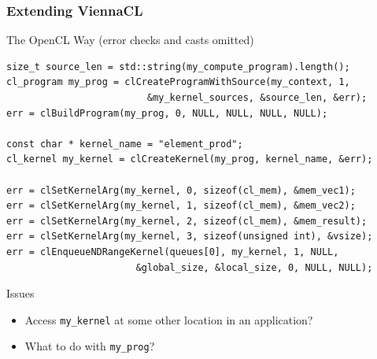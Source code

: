 \begin{frame}[fragile]
\frametitle{Extending ViennaCL}

\begin{block}{The OpenCL Way (error checks and casts omitted)}
  { \lstset{ basicstyle=\scriptsize\ttfamily } \begin{lstlisting}
size_t source_len = std::string(my_compute_program).length();
cl_program my_prog = clCreateProgramWithSource(my_context, 1, 
                         &my_kernel_sources, &source_len, &err);
err = clBuildProgram(my_prog, 0, NULL, NULL, NULL, NULL);

const char * kernel_name = "element_prod";
cl_kernel my_kernel = clCreateKernel(my_prog, kernel_name, &err);

err = clSetKernelArg(my_kernel, 0, sizeof(cl_mem), &mem_vec1);
err = clSetKernelArg(my_kernel, 1, sizeof(cl_mem), &mem_vec2);
err = clSetKernelArg(my_kernel, 2, sizeof(cl_mem), &mem_result);
err = clSetKernelArg(my_kernel, 3, sizeof(unsigned int), &vsize);
err = clEnqueueNDRangeKernel(queues[0], my_kernel, 1, NULL, 
                       &global_size, &local_size, 0, NULL, NULL);
  \end{lstlisting} }
\end{block}

 \begin{block}{Issues}
  \begin{itemize}
   \item Access \texttt{my\_kernel} at some other location in an application?
   \item What to do with \texttt{my\_prog}?
  \end{itemize}
 \end{block}

  

\end{frame}



